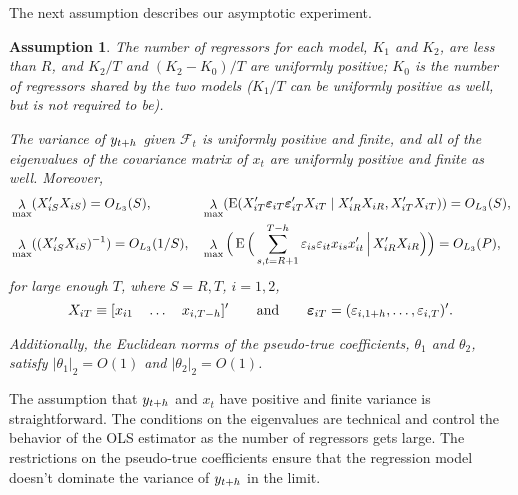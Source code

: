 \documentclass[11pt]{article}
\newcommand{\e}{\varepsilon}
\DeclareMathOperator{\eigen}{\lambda}
\newtheorem{asmp}{Assumption}
\begin{document}
The next assumption describes our asymptotic experiment.
\begin{asmp}\label{asmp-2}
  The number of regressors for each model, $K_1$ and $K_2$, are less
  than $R$, and $K_2/T$ and $(K_2-K_0)/T$ are uniformly positive;
  $K_0$ is the number of regressors shared by the two models ($K_1/T$
  can be uniformly positive as well, but is not required to be).

  The variance of $y_{t+h}$ given $\mathcal{F}_t$ is uniformly
  positive and finite, and all of the eigenvalues of the covariance
  matrix of $x_t$ are uniformly positive and finite as well.
  Moreover,
  \begin{align*}
    &\eigen_{\max}(X_{iS}'X_{iS}) = O_{L_3}(S),&
    &\eigen_{\max}(\E(X_{iT}'\ep{iT}\ep{iT}'X_{iT}
    \mid X_{iR}'X_{iR}, X_{iT}'X_{iT})) = O_{L_3}(S),\\
    &\eigen_{\max}((X_{iS}'X_{iS})^{-1}) = O_{L_3}(1/S),&
    &\eigen_{\max}\Big(\E\Big( \sum_{s,t=R+1}^{T-h} \e_{is} \e_{it} x_{is}x_{it}'
    \,\Big|\, X_{iR}'X_{iR} \Big)\Big) = O_{L_3}(P),
  \end{align*}
  for large enough $T$, where $S = R,T$, $i = 1,2$,
  \[ X_{iT} \equiv [x_{i1} \quad \dots \quad x_{i,T-\h}]' \qquad
  \text{and} \qquad \ep{iT} = (\e_{i,1+\h}, \dots, \e_{i,T})'.\]

  Additionally, the Euclidean norms of the pseudo-true coefficients,
  $\theta_1$ and $\theta_2$, satisfy $|\theta_1|_2 = O(1)$ and
  $|\theta_2|_2 = O(1)$.
\end{asmp}

The assumption that $y_{t+h}$ and $x_t$ have positive and finite
variance is straightforward.  The conditions on the eigenvalues are
technical and control the behavior of the OLS estimator as the
number of regressors gets large.  The restrictions on the pseudo-true
coefficients ensure that the regression model doesn't dominate the
variance of $y_{t+h}$ in the limit.
\end{document}
